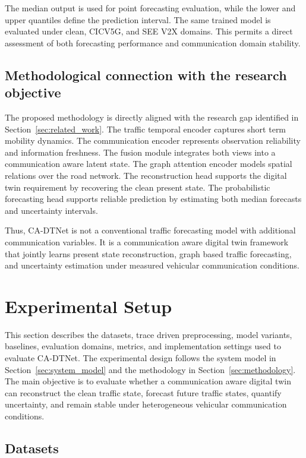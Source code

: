 \documentclass[pdflatex,sn-mathphys-num]{sn-jnl}%
\theoremstyle{thmstyleone}%
\theoremstyle{thmstyletwo}%
\theoremstyle{thmstylethree}%
\begin{document}
The median output is used for point forecasting evaluation, while the lower and upper quantiles define the prediction interval. The same trained model is evaluated under clean, CICV5G, and SEE V2X domains. This permits a direct assessment of both forecasting performance and communication domain stability.

\subsection{Methodological connection with the research objective}
\label{subsec:methodological_connection}

The proposed methodology is directly aligned with the research gap identified in Section~\ref{sec:related_work}. The traffic temporal encoder captures short term mobility dynamics. The communication encoder represents observation reliability and information freshness. The fusion module integrates both views into a communication aware latent state. The graph attention encoder models spatial relations over the road network. The reconstruction head supports the digital twin requirement by recovering the clean present state. The probabilistic forecasting head supports reliable prediction by estimating both median forecasts and uncertainty intervals.

Thus, CA-DTNet is not a conventional traffic forecasting model with additional communication variables. It is a communication aware digital twin framework that jointly learns present state reconstruction, graph based traffic forecasting, and uncertainty estimation under measured vehicular communication conditions.

\section{Experimental Setup}
\label{sec:experimental_setup}

This section describes the datasets, trace driven preprocessing, model variants, baselines, evaluation domains, metrics, and implementation settings used to evaluate CA-DTNet. The experimental design follows the system model in Section~\ref{sec:system_model} and the methodology in Section~\ref{sec:methodology}. The main objective is to evaluate whether a communication aware digital twin can reconstruct the clean traffic state, forecast future traffic states, quantify uncertainty, and remain stable under heterogeneous vehicular communication conditions.

\subsection{Datasets}
\label{subsec:datasets}
\end{document}
